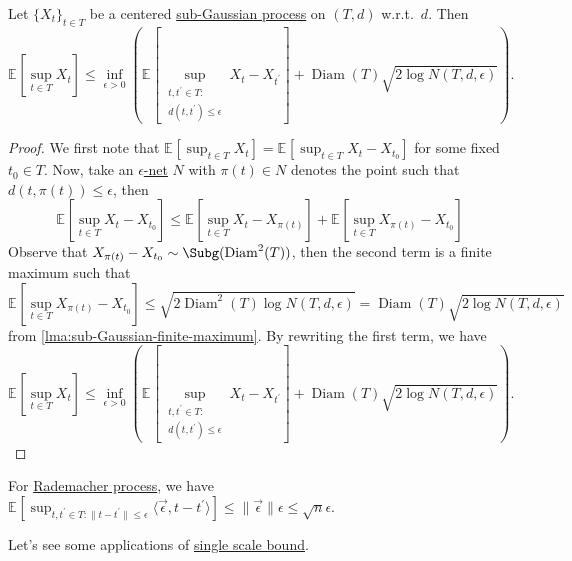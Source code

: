 \begin{lemma}\label{lma:single-scale-bound}
	Let \(\{ X_t \} _{t\in T}\) be a centered \hyperref[def:sub-Gaussian-process]{sub-Gaussian process} on \((T, d)\) w.r.t.\ \(d\). Then
	\[
		\mathbb{E}_{}\left[\sup _{t\in T} X_t \right]
		\leq \inf _{\epsilon > 0} \left( \mathbb{E}_{}\left[\sup _{\substack{t, t^{\prime} \in T\colon \\ d(t, t^{\prime} ) \leq \epsilon }} X_t - X_{t^{\prime} } \right] + \mathop{\mathrm{Diam}}(T) \sqrt{2 \log N(T, d, \epsilon )} \right) .
	\]
\end{lemma}
\begin{proof}
	We first note that \(\mathbb{E}_{}\left[\sup _{t\in T} X_t \right] = \mathbb{E}_{}\left[\sup _{t\in T} X_t - X_{t_0} \right]  \) for some fixed \(t_0\in T\). Now, take an \hyperref[def:eps-net]{\(\epsilon\)-net} \(N\) with \(\pi (t) \in N\) denotes the point such that \(d(t, \pi (t)) \leq \epsilon \), then
	\[
		\mathbb{E}_{}\left[\sup _{t\in T} X_t - X_{t_0} \right]
		\leq \mathbb{E}_{}\left[\sup _{t\in T} X_t - X_{\pi (t)} \right] + \mathbb{E}_{}\left[\sup _{t\in T} X_{\pi (t)} - X_{t_0} \right]
	\]
	Observe that \(X_{\pi (t)} - X_{t_0} \sim \Subg(\mathop{\mathrm{Diam}}^2(T) )\), then the second term is a finite maximum such that
	\[
		\mathbb{E}_{}\left[\sup _{t\in T} X_{\pi (t)} - X_{t_0} \right]
		\leq \sqrt{2 \mathop{\mathrm{Diam}}\nolimits^2(T) \log N(T, d, \epsilon )}
		= \mathop{\mathrm{Diam}}(T) \sqrt{2 \log N(T, d, \epsilon )}
	\]
	from \autoref{lma:sub-Gaussian-finite-maximum}. By rewriting the first term, we have
	\[
		\mathbb{E}_{}\left[\sup _{t\in T} X_t \right]
		\leq \inf _{\epsilon > 0} \left( \mathbb{E}_{}\left[\sup _{\substack{t, t^{\prime} \in T\colon \\ d(t, t^{\prime} ) \leq \epsilon }} X_t - X_{t^{\prime} } \right] + \mathop{\mathrm{Diam}}(T) \sqrt{2 \log N(T, d, \epsilon )} \right) .
	\]
\end{proof}

\begin{eg}
	For \hyperref[eg:Rademacher-process]{Rademacher process}, we have \(\mathbb{E}_{}\left[\sup _{t, t^{\prime} \in T \colon \lVert t - t^{\prime} \rVert \leq \epsilon } \langle \vec{\epsilon} , t - t^{\prime}  \rangle  \right] \leq \lVert \vec{\epsilon} \rVert \epsilon \leq \sqrt{n} \epsilon  \).
\end{eg}

Let's see some applications of \hyperref[lma:single-scale-bound]{single scale bound}.

